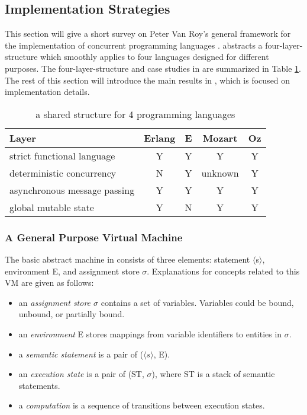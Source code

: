 \subsection{Implementation Strategies}
\label{sec:vanroy}

This section will give a short survey on Peter Van Roy's general framework for the implementation of concurrent programming languages  \cite{Roy06convergencein, roy}.  \cite{Roy06convergencein} abstracts a four-layer-structure which smoothly applies to four languages designed for different purposes.  The four-layer-structure and case studies in \cite{Roy06convergencein} are summarized in Table \ref{layer}.  The rest of this section will introduce the main results in \cite{roy}, which is focused on implementation details.

\begin{table}
  \begin{center}
  \begin{tabular}{| l | c | c | c | c |}
\hline
Layer&      Erlang   &    E   &    Mozart  &Oz\\
\hline
strict functional language          &Y&Y&Y&Y\\
\hline
deterministic concurrency          & N&Y&unknown&Y\\
\hline
asynchronous message passing&Y&Y&Y&Y\\
\hline 
global mutable state                     &Y&N&Y&Y\\  
\hline
  \end{tabular}
  \end{center}
  \caption{a shared structure for 4 programming languages}
  \label{layer}
\end{table}


\subsubsection{A General Purpose Virtual Machine}
The basic abstract machine in \cite{roy} consists of three elements: statement $\langle$s$\rangle$, environment E, and assignment store $\sigma$.  Explanations for concepts related to this VM are given as follows:
\newpage
\begin{itemize}
  \item an {\it{assignment store  $\sigma$}} contains a set of variables.  Variables could be bound, unbound, or partially bound.
  \item an {\it{environment}} E stores mappings from variable identifiers to entities in $\sigma$.
  \item a {\it{semantic statement}} is a pair of ($\langle s \rangle$, E).
  \item an {\it{execution state}} is a pair of (ST, $\sigma$), where ST is a stack of semantic statements.
  \item a {\it{computation}} is a sequence of transitions between execution states.
\end{itemize}

